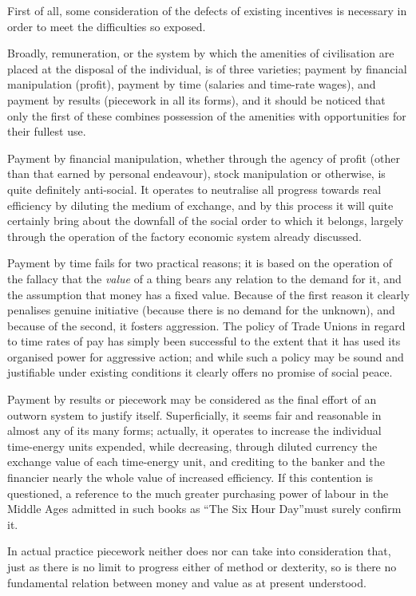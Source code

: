 \documentclass{book}
\begin{document}
First of all, some consideration of the defects of existing incentives is necessary in order to meet the difficulties so exposed.

Broadly, remuneration, or the system by which the amenities of civilisation are placed at the disposal of the individual, is of three varieties; payment by financial manipulation (profit), payment by time (salaries and time-rate wages), and payment by results (piecework in all its forms), and it should be noticed that only the first of these combines possession of the amenities with opportunities for their fullest use.

Payment by financial manipulation, whether through the agency of profit (other than that earned by personal endeavour), stock manipulation or otherwise, is quite definitely anti-social. It operates to neutralise all progress towards real efficiency by diluting the medium of exchange, and by this process it will quite certainly bring about the downfall of the social order to which it belongs, largely through the operation of the factory economic system already discussed.

Payment by time fails for two practical reasons; it is based on the operation of the fallacy that the \emph{value} of a thing bears any relation to the demand for it, and the assumption that money has a fixed value. Because of the first reason it clearly penalises genuine initiative (because there is no demand for the unknown), and because of the second, it fosters aggression. The policy of Trade Unions in regard to time rates of pay has simply been successful to the extent that it has used its organised power for aggressive action; and while such a policy may be sound and justifiable under existing conditions it clearly offers no promise of social peace.

Payment by results or piecework may be considered as the final effort of an outworn system to justify itself. Superficially, it seems fair and reasonable in almost any of its many forms; actually, it operates to increase the individual time-energy units expended, while decreasing, through diluted currency the exchange value of each time-energy unit, and crediting to the banker and the financier nearly the whole value of increased efficiency. If this contention is questioned, a reference to the much greater purchasing power of labour in the Middle Ages admitted in such books as “The Six Hour Day”\footnotemark[1] must surely confirm it.

In actual practice piecework neither does nor can take into consideration that, just as there is no limit to progress either of method or dexterity, so is there no fundamental relation between money and value as at present understood.
\end{document}
